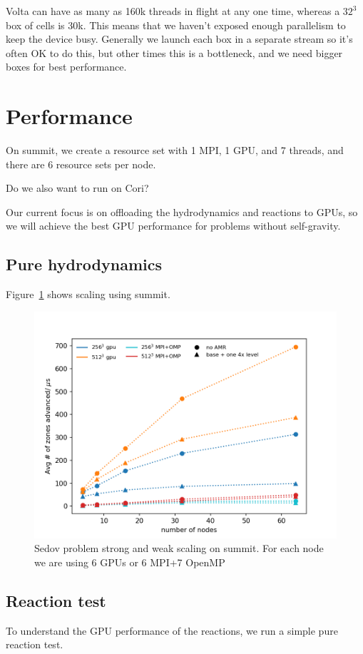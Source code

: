 \documentclass[preprint,times]{aastex62}
\newcommand{\MarginPar}[1]{\marginpar{\vskip-\baselineskip\raggedright\tiny\sffamily\hrule\smallskip{\color{red}#1}\par\smallskip\hrule}}
\begin{document}
Volta can have as many as 160k threads in flight at any one time,
whereas a $32^3$ box of cells is 30k.  This means that we haven't
exposed enough parallelism to keep the device busy.  Generally we
launch each box in a separate stream so it's often OK to do this, but
other times this is a bottleneck, and we need bigger boxes for best
performance.

\section{Performance}

On summit, we create a resource set with 1 MPI, 1 GPU, and 7 threads,
and there are 6 resource sets per node.

Do we also want to run on Cori?

Our current focus is on offloading the hydrodynamics and reactions to
GPUs, so we will achieve the best GPU performance for problems without
self-gravity.

\subsection{Pure hydrodynamics}
Figure~\ref{fig:scalingsedov} shows scaling using summit.   

\begin{figure}[t]
\centering
\includegraphics[width=0.48\linewidth]{summit_sedov.png} 
\begin{minipage}[b]{0.48\linewidth}
\caption{\label{fig:scalingsedov} Sedov problem strong and weak scaling on summit. For each node we are using 6 GPUs or 6 MPI+7 OpenMP}
\end{minipage}
\end{figure}

\subsection{Reaction test}

To understand the GPU performance of the reactions, we run a simple pure reaction test.  \MarginPar{is this {\tt test\_react}?}
\end{document}
